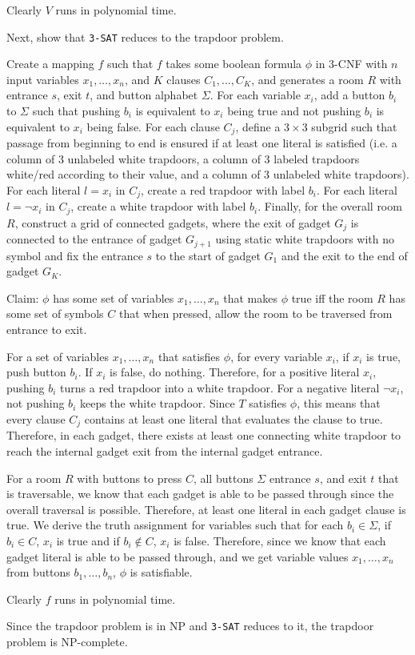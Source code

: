 \documentclass{article}
\begin{document}
        Clearly $V$ runs in polynomial time.

        Next, show that \texttt{3-SAT} reduces to the trapdoor problem.

        Create a mapping $f$ such that $f$ takes some boolean formula $\phi$ in 3-CNF with $n$ input variables $x_1, \ldots, x_n$, and $K$ clauses $C_1, \ldots, C_K$, and generates a room $R$ with entrance $s$, exit $t$, and button alphabet $\Sigma$. For each variable $x_i$, add a button $b_i$ to $\Sigma$ such that pushing $b_i$ is equivalent to $x_i$ being true and not pushing $b_i$ is equivalent to $x_i$ being false. For each clause $C_j$, define a $3 \times 3$ subgrid such that passage from beginning to end is ensured if at least one literal is satisfied (i.e. a column of 3 unlabeled white trapdoors, a column of 3 labeled trapdoors white/red according to their value, and a column of 3 unlabeled white trapdoors). For each literal $l = x_i$ in $C_j$, create a red trapdoor with label $b_i$. For each literal $l = \neg x_i$ in $C_j$, create a white trapdoor with label $b_i$. Finally, for the overall room $R$, construct a grid of connected gadgets, where the exit of gadget $G_j$ is connected to the entrance of gadget $G_{j+1}$ using static white trapdoors with no symbol and fix the entrance $s$ to the start of gadget $G_1$ and the exit to the end of gadget $G_K$.

        Claim: $\phi$ has some set of variables $x_1, \ldots, x_n$ that makes $\phi$ true iff the room $R$ has some set of symbols $C$ that when pressed, allow the room to be traversed from entrance to exit. 

        For a set of variables $x_1, \ldots, x_n$ that satisfies $\phi$, for every variable $x_i$, if $x_i$ is true, push button $b_i$. If $x_i$ is false, do nothing. Therefore, for a positive literal $x_i$, pushing $b_i$ turns a red trapdoor into a white trapdoor. For a negative literal $\neg x_i$, not pushing $b_i$ keeps the white trapdoor. Since $T$ satisfies $\phi$, this means that every clause $C_j$ contains at least one literal that evaluates the clause to true. Therefore, in each gadget, there exists at least one connecting white trapdoor to reach the internal gadget exit from the internal gadget entrance. 

        For a room $R$ with buttons to press $C$, all buttons $\Sigma$ entrance $s$, and exit $t$ that is traversable, we know that each gadget is able to be passed through since the overall traversal is possible. Therefore, at least one literal in each gadget clause is true. We derive the truth assignment for variables such that for each $b_i \in \Sigma$, if $b_i \in C$, $x_i$ is true and if $b_i \notin C$, $x_i$ is false. Therefore, since we know that each gadget literal is able to be passed through, and we get variable values $x_1, \ldots, x_n$ from buttons $b_1, \ldots, b_n$, $\phi$ is satisfiable. 

        Clearly $f$ runs in polynomial time. 

        Since the trapdoor problem is in NP and \texttt{3-SAT} reduces to it, the trapdoor problem is NP-complete.



    
\end{document}
